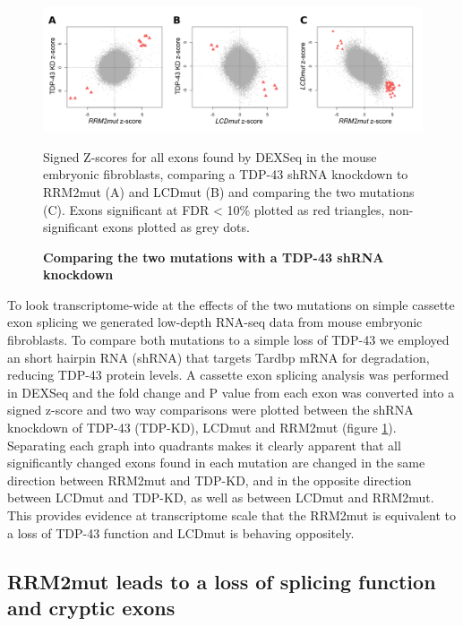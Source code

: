 \begin{figure}[h!]
	\centering
	\includegraphics[width=14cm]{Figures/05_tdp_mice/mef_scatters.png}
	\caption{\textbf{Comparing the two mutations with a TDP-43 shRNA knockdown}}
	Signed Z-scores for all exons found by DEXSeq in the mouse embryonic fibroblasts, comparing a TDP-43 shRNA knockdown to RRM2mut (A) and LCDmut (B) and comparing the two mutations (C). Exons significant at FDR < 10\% plotted as red triangles, non-significant exons plotted as grey dots.
	\label{fig:mef_scatters}
\end{figure}

To look transcriptome-wide at the effects of the two mutations on simple cassette exon splicing we generated low-depth RNA-seq data from mouse embryonic fibroblasts. To compare both mutations to a simple loss of TDP-43 we employed an short hairpin RNA (shRNA) that targets Tardbp mRNA for degradation, reducing TDP-43 protein levels. A cassette exon splicing analysis was performed in DEXSeq and the fold change and P value from each exon was converted into a signed z-score and two way comparisons were plotted between the shRNA knockdown of TDP-43 (TDP-KD), LCDmut and RRM2mut (figure \ref{fig:mef_scatters}). Separating each graph into quadrants makes it clearly apparent that all significantly changed exons found in each mutation are changed in the same direction between RRM2mut and TDP-KD, and in the opposite direction between LCDmut and TDP-KD, as well as between LCDmut and RRM2mut. This provides evidence at transcriptome scale that the RRM2mut is equivalent to a loss of TDP-43 function and LCDmut is behaving oppositely.

\subsection{RRM2mut leads to a loss of splicing function and cryptic exons}

